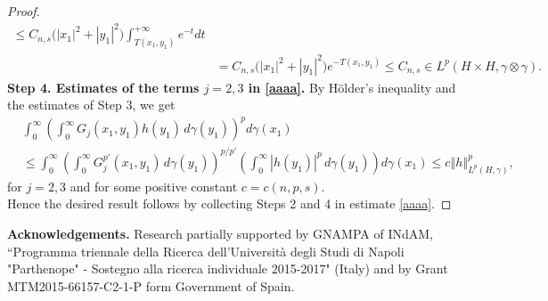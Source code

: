 \documentclass[a4paper,10pt,reqno]{amsart}
\numberwithin{equation}{section}
\begin{document}
\begin{proof}
\begin{align*}
\leq C_{n,s}\big(|x_1|^2+|y_1|^2\big)\int_{T(x_{1},y_{1})}^{+\infty}e^{-t}dt\\
&  =C_{n,s}\big(\left\vert x_{1}\right\vert ^{2}+\left\vert y_{1}\right\vert^{2}\big)
e^{-T(x_{1},y_{1})}\leq C_{n,s}\in L^{p}(H \times H,\gamma\otimes\gamma).
\end{align*}
\noindent\textbf{Step 4. Estimates of the terms $j=2,3$ in \eqref{aaaa}.}
By H\"{o}lder's inequality and the estimates of Step 3, we get
\begin{align*}
&\int_{0}^{\infty}\left(\int_{0}^{\infty}G_{j}(x_{1},y_{1})h(y_{1})\,d\gamma(y_{1})\right)^{p}d\gamma(x_{1})\\
&  \leq\int_{0}^{\infty}\left(\int_{0}^{\infty}G_{j}^{p'}(x_{1},y_{1})\,d\gamma(y_{1})\right)^{p/p'}\left(
\int_{0}^{\infty}|h(y_{1})|^p\,d\gamma(y_{1})\right)d\gamma(x_{1})\leq
c\left\Vert h\right\Vert _{L^{p}(H,\gamma)}^{p},
\end{align*}
for $j=2,3$ and for some positive constant $c=c(n,p,s)$.\\
Hence the desired result follows by collecting Steps 2 and 4 in estimate \eqref{aaaa}.
\end{proof}



\bigskip
\noindent\textbf{Acknowledgements.} Research partially supported by GNAMPA of INdAM, ``Programma
triennale della Ricerca dell'Universit\`{a} degli Studi di Napoli "Parthenope"
- Sostegno alla ricerca individuale 2015-2017" (Italy) and
by Grant MTM2015-66157-C2-1-P form Government of Spain.



\end{document}
